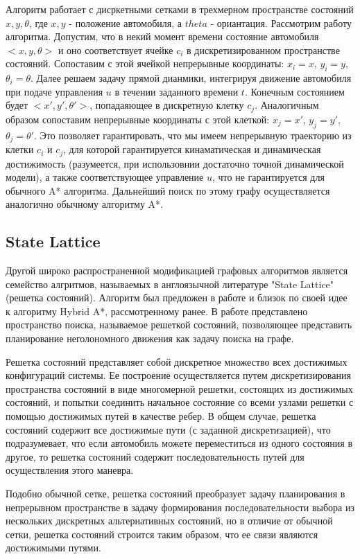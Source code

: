 Алгоритм работает с дисркетными сетками в трехмерном пространстве состояний $x, y, \theta$, где $x, y$ - положение
автомобиля, а $theta$ - ориантация. Рассмотрим работу алгоритма. Допустим, что в некий момент времени состояние
автомобиля $<x, y, \theta>$ и оно соответствует ячейке $c_i$ в дискретизированном пространстве состояний. Сопоставим
с этой ячейкой непрерывные координаты: $x_i = x$, $y_i = y$, $\theta_i = \theta$. Далее решаем задачу прямой дианмики,
интегрируя движение автомобиля при подаче управления $u$ в течении заданного времени $t$. Конечным состоянием будет
$<x', y', \theta'>$, попадаяющее в дискретную клетку $c_j$. Аналогичным образом сопоставим непрерывные координаты с
этой клеткой: $x_j = x'$, $y_j = y'$, $\theta_j = \theta'$. Это позволяет гарантировать, что мы имеем непрерывную
траекторию из клетки $c_i$ и $c_j$, для которой гарантируется кинаматическая и динамическая достижимость
(разумеется, при использовнии достаточно точной динамической модели), а также соответствующее управление $u$,
что не гарантируется для обычного A* алгоритма. Дальнейший поиск по этому графу осуществляется аналогично обычному
алгоритму A*.


\subsection{State Lattice}
Другой широко распространенной модификацией графовых алгоритмов является семейство алгритмов, называемых в англоязычной
литературе "State Lattice" (решетка состояний). Алгоритм был предложен в работе \cite{motion_planning_lattice_1} и
близок по своей идее к алгоритму Hybrid A*, рассмотренному ранее. В работе представлено пространство поиска,
называемое решеткой состояний, позволяющее представить планирование неголономного движения как задачу поиска на графе.

Решетка состояний представляет собой дискретное множество всех достижимых конфигураций системы. Ее построение
осуществляется путем дискретизирования пространства состояний в виде многомерной решетки, состоящих
из достижимых состояний, и попытки соединить начальное состояние со всеми узлами решетки с помощью достижимых путей
в качестве ребер. В общем случае, решетка состояний содержит все достижимые пути (с заданной дискретизацией), что
подразумевает, что если автомобиль можете переместиться из одного состояния в другое, то решетка состояний содержит
последовательность путей для осуществления этого маневра.

Подобно обычной сетке, решетка состояний преобразует задачу планирования в непрерывном пространстве в задачу формирования
последовательности выбора из нескольких дискретных альтернативных состояний, но в отличие от обычной сетки, решетка
состояний строится таким образом, что ее связи являются достижимыми путями.

